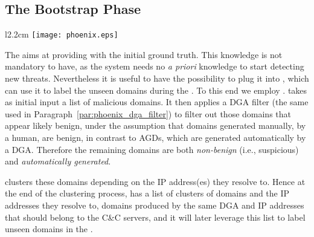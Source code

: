 \subsection{The Bootstrap Phase} %
\label{sub:the_bootstrap_approach}
\begin{wrapfigure}{l}{2.2cm}
\centering
    \texttt{[image: phoenix.eps]}
\end{wrapfigure}
The  aims at providing \thesystem with the initial ground
truth. This knowledge is not mandatory to have, as the system needs no \emph{a
priori} knowledge to start detecting new threats. Nevertheless it is useful to have
the possibility to plug it into \thesystem, which can use it to label the unseen domains during the . To this end we employ
\phoenix. \phoenix takes as initial input a list of malicious domains. It then
applies a DGA filter (the same used in Paragraph~\ref{par:phoenix_dga_filter})
to filter out those domains that appear likely benign, under the assumption that domains generated manually, by a human, are benign, in contrast to AGDs, which are generated automatically by a DGA. Therefore
the remaining domains are both \emph{non-benign} (i.e., suspicious) and \emph{automatically generated}.

\thesystem clusters these domains depending on the IP address(es) they resolve to. Hence
at the end of the clustering process, \thesystem has a list of clusters of domains
and the IP addresses they resolve to, domains produced by the same DGA and IP
addresses that should belong to the C\&C servers, and it will later leverage this
list to label unseen domains in the .

